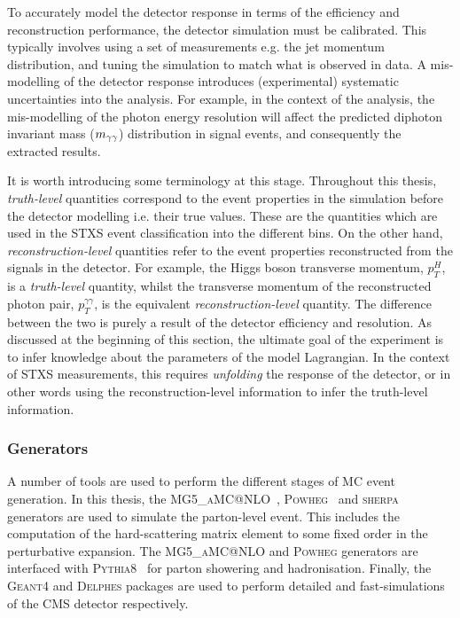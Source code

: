 To accurately model the detector response in terms of the efficiency and reconstruction performance, the detector simulation must be calibrated. This typically involves using a set of measurements e.g. the jet momentum distribution, and tuning the simulation to match what is observed in data. A mis-modelling of the detector response introduces (experimental) systematic uncertainties into the analysis. For example, in the context of the \Hgg analysis, the mis-modelling of the photon energy resolution will affect the predicted diphoton invariant mass ($m_{\gamma\gamma}$) distribution in signal events, and consequently the extracted results. 

It is worth introducing some terminology at this stage. Throughout this thesis, \textit{truth-level} quantities correspond to the event properties in the simulation before the detector modelling i.e. their true values. These are the quantities which are used in the STXS event classification into the different bins. On the other hand, \textit{reconstruction-level} quantities refer to the event properties reconstructed from the signals in the detector. For example, the Higgs boson transverse momentum, $p_T^H$, is a \textit{truth-level} quantity, whilst the transverse momentum of the reconstructed photon pair, $p_T^{\gamma\gamma}$, is the equivalent \textit{reconstruction-level} quantity. The difference between the two is purely a result of the detector efficiency and resolution. As discussed at the beginning of this section, the ultimate goal of the experiment is to infer knowledge about the parameters of the model Lagrangian. In the context of STXS measurements, this requires \textit{unfolding} the response of the detector, or in other words using the reconstruction-level information to infer the truth-level information.

\subsubsection{Generators}
A number of tools are used to perform the different stages of MC event generation. In this thesis, the \textsc{MG5\_aMC@NLO}~\cite{Alwall:2014hca}, \textsc{Powheg}~\cite{Nason:2004rx,Frixione:2007vw,Alioli:2008tz,Nason:2009ai,Alioli:2010xd,Hartanto:2015uka} and \textsc{sherpa}~\cite{Gleisberg:2008ta} generators are used to simulate the parton-level event. This includes the computation of the hard-scattering matrix element to some fixed order in the perturbative expansion. The \textsc{MG5\_aMC@NLO} and \textsc{Powheg} generators are interfaced with \textsc{Pythia8}~\cite{Sjostrand:2014zea} for parton showering and hadronisation. Finally, the \textsc{Geant4} and \textsc{Delphes} packages are used to perform detailed and fast-simulations of the CMS detector respectively.

